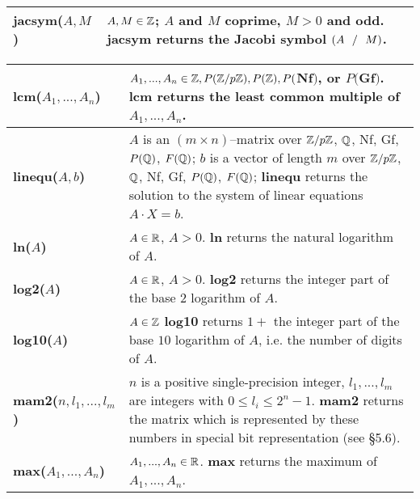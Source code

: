 {\begin{tabular}{|p{1.95in}|p{3.83in}|}
{\bf jacsym($A,M$)} &
$A,M \in \mbox{$\mathbb Z$}$; $A$ and $M$ coprime, $M>0$ and odd.\newline
{\bf jacsym} returns the Jacobi symbol $(A\mbox{\ \ } /\mbox{\ \ } M)$.\\ \hline
\end{tabular}

\newpage

\begin{tabular}{|p{1.95in}|p{3.83in}|} \hline

{\bf lcm($A_1,...,A_n$)} &
$A_1,...,A_n \in \mbox{$\mathbb Z$}, P(\mbox{$\mathbb Z$}/p\mbox{$\mathbb Z$}), P(\mbox{$\mathbb Z$}), P($Nf$)$, or $P($Gf$)$.\newline
{\bf lcm} returns the least common multiple of $A_1,...,A_n$.\\ \hline

{\bf linequ($A,b$)} &
$A$ is an $(m \times n)$--matrix over $\mbox{$\mathbb Z$}/p\mbox{$\mathbb Z$}$, $\mbox{$\mathbb Q$}$, Nf, Gf, $P(\mbox{$\mathbb Q$})$,
$F(\mbox{$\mathbb Q$})$;\newline
$b$ is a vector of length $m$ over $\mbox{$\mathbb Z$}/p\mbox{$\mathbb Z$}$, $\mbox{$\mathbb Q$}$, Nf, Gf, $P(\mbox{$\mathbb Q$})$,
$F(\mbox{$\mathbb Q$})$;\newline
{\bf linequ} returns the solution to the system of linear equa\-tions
$A \cdot X = b$.\\ \hline

{\bf ln($A$)} &
$A \in \mbox{$\mathbb R$}$, $A>0$.\newline
{\bf ln} returns the natural logarithm of $A$.\\ \hline

{\bf log2($A$)} &
$A \in \mbox{$\mathbb R$}$, $A>0$.\newline
{\bf log2} returns the integer part of the base $2$ logarithm of $A$. \\ \hline

{\bf log10($A$)} &
$A \in \mbox{$\mathbb Z$}$\newline
{\bf log10} returns $1 +$ the integer part of the base $10$ logarithm of $A$,
i.e. the number of digits of $A$. \\ \hline

{\bf mam2($n,l_1,...,l_m$)} &
$n$ is a positive single-precision integer, $l_1,...,l_m$ are integers with
$0\leq l_i \leq 2^n-1$.\newline
{\bf mam2} returns the matrix which is represented by these numbers in special 
bit representation (see \S 5.6).\\ \hline

{\bf max($A_1,...,A_n$)} &
$A_1,...,A_n\in\mbox{$\mathbb R$}$.\newline
{\bf max} returns the maximum of $A_1,...,A_n$.\\ \hline


\end{tabular}}
